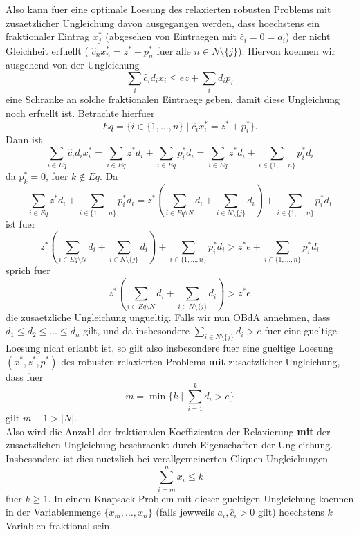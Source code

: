 \documentclass[titlepage, a4paper]{amsbook}
\theoremstyle{plain}
\theoremstyle{break}
\theoremstyle{definition}
\theoremstyle{remark}
\numberwithin{equation}{thm}
\begin{document}
Also kann fuer eine optimale Loesung des relaxierten robusten Problems mit zusaetzlicher Ungleichung davon ausgegangen werden, dass hoechstens ein fraktionaler Eintrag $x^*_j$ (abgesehen von Eintraegen mit $\hat{c}_i=0=a_i$) der nicht Gleichheit erfuellt ( $\hat{c}_nx^*_n = z^* + p^*_n$ fuer alle $n \in N \setminus\{j\}$).
Hiervon koennen wir ausgehend von der Ungleichung 
\[\sum_i \hat{c}_i d_i x_i \leq ez + \sum_i d_i p_i\]
eine Schranke an solche fraktionalen Eintraege geben, damit diese Ungleichung noch erfuellt ist.
Betrachte hierfuer 
\[Eq=\{i \in \{1, \ldots, n\} \mid \hat{c}_i x^*_i = z^* + p^*_i\}.\]
Dann ist
\[\sum_{i \in Eq}\hat{c}_i d_i x^*_i = \sum_{i \in Eq}z^* d_i + \sum_{i \in Eq}p^*_i d_i = \sum_{i \in Eq}z^* d_i + \sum_{i \in \{1, \ldots, n\}}p^*_i d_i\]
da $p^*_k=0$, fuer $k \notin Eq$.
Da
\[\sum_{i \in Eq}z^* d_i + \sum_{i \in \{1, \ldots, n\}}p^*_i d_i= z^*(\sum_{i \in Eq\setminus N} d_i+ \sum_{i\in N\setminus\{j\}} d_i)+ \sum_{i \in \{1, \ldots, n\}}p^*_i d_i\]
ist fuer
\[z^*(\sum_{i \in Eq\setminus N} d_i+ \sum_{i \in N\setminus\{j\}} d_i)+ \sum_{i \in \{1, \ldots, n\}}p^*_i d_i > z^* e + \sum_{i \in \{1, \ldots, n\}}p^*_i d_i\]
sprich fuer
\[z^*(\sum_{i \in Eq\setminus N} d_i+ \sum_{i \in N\setminus\{j\}} d_i) > z^* e\]
die zusaetzliche Ungleichung ungueltig.
Falls wir nun OBdA annehmen, dass $d_1 \leq d_2 \leq \ldots \leq d_n$ gilt, und da insbesondere $\sum_{i \in N\setminus\{j\}} d_i > e$ fuer eine gueltige Loesung nicht erlaubt ist, so gilt also insbesondere fuer eine gueltige Loesung $(x^*,z^*,p^*)$ des robusten relaxierten Problems \textbf{mit} zusaetzlicher Ungleichung, dass fuer 
\[m = \min\{k \mid \sum_{i=1}^k d_i > e\}\]
gilt $m+1 > \vert N \vert$.\\
Also wird die Anzahl der fraktionalen Koeffizienten der Relaxierung \textbf{mit} der zusaetzlichen Ungleichung beschraenkt durch Eigenschaften der Ungleichung. \\
Insbesondere ist dies nuetzlich bei verallgemeinerten Cliquen-Ungleichungen
\[\sum_{i=m}^n x_i \leq k\]
fuer $k\geq 1$. In einem Knapsack Problem mit dieser gueltigen Ungleichung koennen in der Variablenmenge $\{x_m, \ldots, x_n\}$ (falls jewweils $a_i,\hat{c}_i > 0$ gilt) hoechstens $k$ Variablen fraktional sein.
\end{document}
